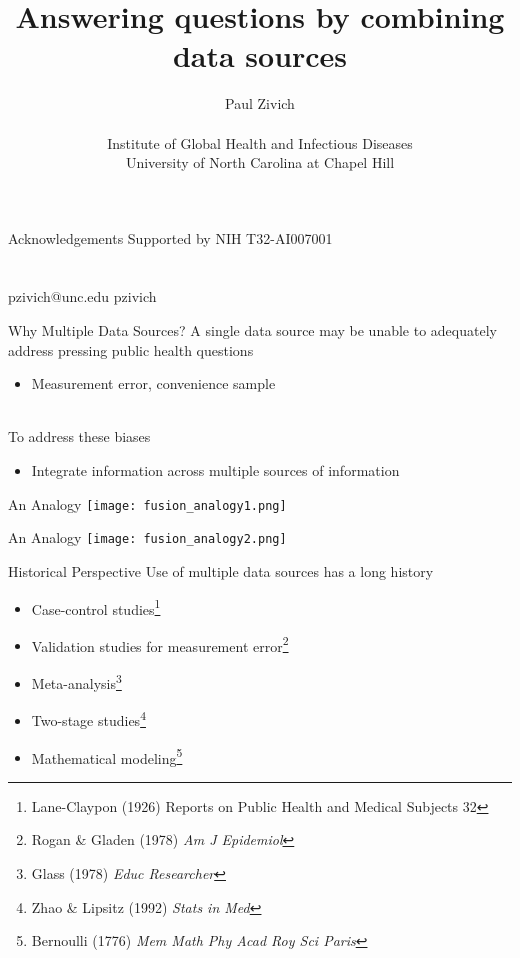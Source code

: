 \documentclass{beamer}
\title{Answering questions by combining data sources}
\author[Zivich]{Paul Zivich \\~\\ Institute of Global Health and Infectious Diseases \\ University of North Carolina at Chapel Hill}
\begin{document}
\begin{frame}
    \maketitle
\end{frame}

\begin{frame}{Acknowledgements}
	Supported by NIH T32-AI007001\\~\\~\\
	
	\centering
	\faEnvelope \quad pzivich@unc.edu \qquad
	\faGithub \quad pzivich\\
\end{frame}

\begin{frame}{Why Multiple Data Sources?}
	A single data source may be unable to adequately address pressing public health questions 
	\begin{itemize}
		\item Measurement error, convenience sample
	\end{itemize}~\\
	To address these biases
	\begin{itemize}
		\item Integrate information across multiple sources of information
	\end{itemize}
\end{frame}

\begin{frame}{An Analogy}
	\centering
	\texttt{[image: fusion\_analogy1.png]}
\end{frame}

\begin{frame}{An Analogy}
	\centering
	\texttt{[image: fusion\_analogy2.png]}
\end{frame}

\begin{frame}{Historical Perspective}
	Use of multiple data sources has a long history
	\begin{itemize}
		\item Case-control studies\footnote[frame]{Lane-Claypon (1926) Reports on Public Health and Medical Subjects 32}
		\item Validation studies for measurement error\footnote[frame]{Rogan \& Gladen (1978) \textit{Am J Epidemiol}}
		\item Meta-analysis\footnote[frame]{ Glass (1978) \textit{Educ Researcher}}
		\item Two-stage studies\footnote[frame]{Zhao \& Lipsitz (1992) \textit{Stats in Med}}
		\item Mathematical modeling\footnote[frame]{Bernoulli (1776) \textit{Mem Math Phy Acad Roy Sci Paris}}
	\end{itemize}
\end{frame}
\end{document}
